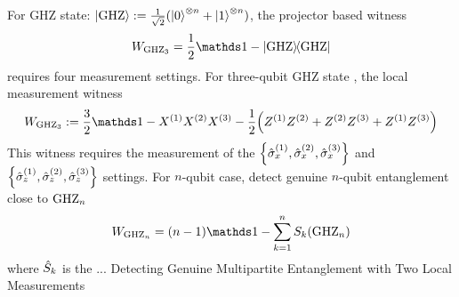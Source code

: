 \begin{example}[GHZ]\label{exm:ghz}
	For GHZ state: $\ket{\text{GHZ}}:=\frac{1}{\sqrt{2}}(\ket{0}^{\otimes n} + \ket{1}^{\otimes n} )$,
	the projector based witness 
	\begin{equation}
		\ew_{\ghz_3}= \frac{1}{2} \identity - \op{\ghz}
	\end{equation}
	requires four measurement settings.
	For three-qubit GHZ state 
	\cite{tothDetectingGenuineMultipartite2005},
	the local measurement witness
	\begin{equation}
		\ew_{\ghz_3} := \frac{3}{2} \identity - \px^{(1)}\px^{(2)}\px^{(3)}
		- \frac{1}{2} \qty(
			\pz^{(1)} \pz^{(2)} + 
			\pz^{(2)} \pz^{(3)} + 
			\pz^{(1)} \pz^{(3)} 
		)
	\end{equation}
	This witness requires the measurement of the $\qty{\hat{\sigma}_x^{(1)},\hat{\sigma}_x^{(2)},\hat{\sigma}_x^{(3)}}$ and $\qty{\hat{\sigma}_z^{(1)},\hat{\sigma}_z^{(2)},\hat{\sigma}_z^{(3)}}$ settings.
	For $n$-qubit case, detect genuine $n$-qubit entanglement close to $\text{GHZ}_n$
	\begin{equation}
		\ew_{\ghz_n} = (n-1) \identity - \sum_{k=1}^n S_k{(\ghz_n)}
	\end{equation}
	where $\hat{S}_k$ is the  ... \cite{tothEntanglementDetectionStabilizer2005}
	Detecting Genuine Multipartite Entanglement with Two Local Measurements \cite{tothDetectingGenuineMultipartite2005}
\end{example}

